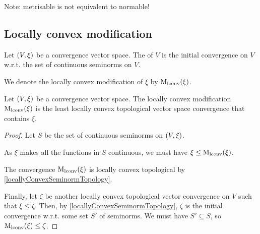 Note: metrisable is not equivalent to normable!


\subsection{Locally convex modification}
\begin{definition}
Let $\left( V, \xi \right)$ be a convergence vector space. The  of $V$ is the initial convergence on $V$ w.r.t. the set of continuous seminorms on $V$.

We denote the locally convex modification of $\xi$ by $\operatorname{M_\text{lconv}}(\xi)$.
\end{definition}

\begin{lemma} \label{locallyConvexModLemma}
Let $\left( V, \xi \right)$ be a convergence vector space. The locally convex modification $\operatorname{M_\text{lconv}}(\xi)$ is the least locally convex topological vector space convergence that contains $\xi$.
\end{lemma}
\begin{proof}
Let $S$ be the set of continuous seminorms on $\left( V, \xi \right)$.

As $\xi$ makes all the functions in $S$ continuous, we must have $\xi \leq \operatorname{M_\text{lconv}}(\xi)$.

The convergence $\operatorname{M_\text{lconv}}(\xi)$ is locally convex topological by \ref{locallyConvexSeminormTopology}.

Finally, let $\zeta$ be another locally convex topological vector convergence on $V$ such that $\xi \leq \zeta$. Then, by \ref{locallyConvexSeminormTopology}, $\zeta$ is the initial convergence w.r.t. some set $S'$ of seminorms. We must have $S'\subseteq S$, so $\operatorname{M_\text{lconv}}(\xi)\leq \zeta$.
\end{proof}

